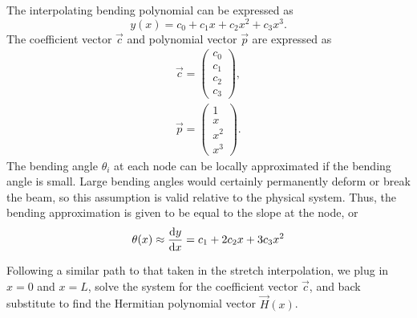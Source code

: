 The interpolating bending polynomial can be expressed as 
\begin{equation}
y(x) = c_0+c_1x+c_2x^2+c_3x^3.
\label{eq:bending.poly}
\end{equation}
The coefficient vector $\vec c$ and polynomial vector $\vec p$ are expressed as
\begin{eqnarray}
\vec{c} = 
\begin{pmatrix}
c_0 \\
c_1 \\
c_2 \\
c_3
\end{pmatrix}, \\
\vec{p} = 
\begin{pmatrix}
1 \\
x \\
x^2 \\
x^3
\end{pmatrix}.
\end{eqnarray}
The bending angle $\theta_i$ at each node can be locally approximated if the bending angle is small. Large bending angles would certainly permanently deform or break the beam, so this assumption is valid relative to the physical system. Thus, the bending approximation is given to be equal to the slope at the node, or
\begin{equation}
\theta(x) \approx \frac{\text dy}{\text dx} = c_1+2c_2x+3c_3x^2
\label{eq:bending.theta.poly}
\end{equation}

Following a similar path to that taken in the stretch interpolation, we plug in $x=0$ and $x=L$, solve the system for the coefficient vector $\vec c$, and back substitute to find the Hermitian polynomial vector $\vec H(x)$.

